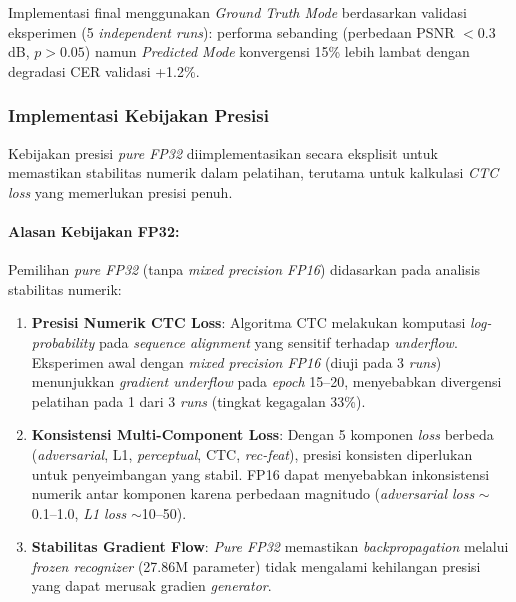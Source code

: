\documentclass[12pt,a4paper]{book}
\begin{document}
Implementasi final menggunakan \textit{Ground Truth Mode} berdasarkan validasi eksperimen (5 \textit{independent runs}): performa sebanding (perbedaan PSNR $<$0.3 dB, $p>0.05$) namun \textit{Predicted Mode} konvergensi 15\% lebih lambat dengan degradasi CER validasi +1.2\%.



\subsubsection{Implementasi Kebijakan Presisi}
\label{subsubsec:precision-policy-implementasi}

Kebijakan presisi \textit{pure FP32} diimplementasikan secara eksplisit untuk memastikan stabilitas numerik dalam pelatihan, terutama untuk kalkulasi \textit{CTC loss} yang memerlukan presisi penuh.

\paragraph{Alasan Kebijakan FP32:}

Pemilihan \textit{pure FP32} (tanpa \textit{mixed precision FP16}) didasarkan pada analisis stabilitas numerik:

\begin{enumerate}[nosep]
\item \textbf{Presisi Numerik CTC Loss}: Algoritma CTC melakukan komputasi \textit{log-probability} pada \textit{sequence alignment} yang sensitif terhadap \textit{underflow}. Eksperimen awal dengan \textit{mixed precision FP16} (diuji pada 3 \textit{runs}) menunjukkan \textit{gradient underflow} pada \textit{epoch} 15--20, menyebabkan divergensi pelatihan pada 1 dari 3 \textit{runs} (tingkat kegagalan 33\%).

\item \textbf{Konsistensi Multi-Component Loss}: Dengan 5 komponen \textit{loss} berbeda (\textit{adversarial}, L1, \textit{perceptual}, CTC, \textit{rec-feat}), presisi konsisten diperlukan untuk penyeimbangan yang stabil. FP16 dapat menyebabkan inkonsistensi numerik antar komponen karena perbedaan magnitudo (\textit{adversarial loss} $\sim$0.1--1.0, \textit{L1 loss} $\sim$10--50).

\item \textbf{Stabilitas Gradient Flow}: \textit{Pure FP32} memastikan \textit{backpropagation} melalui \textit{frozen recognizer} (27.86M parameter) tidak mengalami kehilangan presisi yang dapat merusak gradien \textit{generator}.
\end{enumerate}
\end{document}
